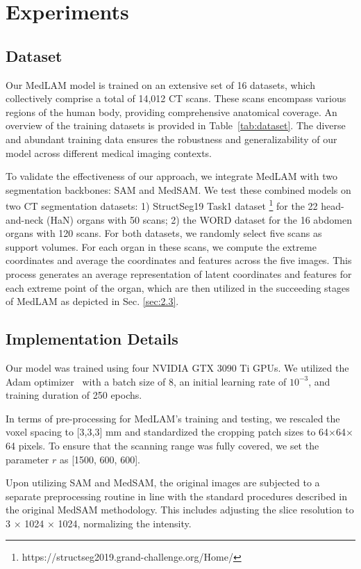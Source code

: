 \documentclass[a4paper]{llncs}
\begin{document}
\section{Experiments}

\subsection{Dataset}
\par Our MedLAM model is trained on an extensive set of 16 datasets, which collectively comprise a total of 14,012 CT scans. These scans encompass various regions of the human body, providing comprehensive anatomical coverage. An overview of the training datasets is provided in Table~\ref{tab:dataset}. The diverse and abundant training data ensures the robustness and generalizability of our model across different medical imaging contexts.
\par To validate the effectiveness of our approach, we integrate MedLAM with two segmentation backbones: SAM\cite{kirillov2023segment} and MedSAM\cite{MedSAM}. We test these combined models on two CT segmentation datasets: 1) StructSeg19 Task1 dataset \footnote{https://structseg2019.grand-challenge.org/Home/} for the 22 head-and-neck (HaN) organs with 50 scans; 2) the WORD dataset \cite{luo2022word} for the 16 abdomen organs with 120 scans. For both datasets, we randomly select five scans as support volumes. For each organ in these scans, we compute the extreme coordinates and average the coordinates and features across the five images. This process generates an average representation of latent coordinates and features for each extreme point of the organ, which are then utilized in the succeeding stages of MedLAM as depicted in Sec. \ref{sec:2.3}.



\subsection{Implementation Details}
Our model was trained using four NVIDIA GTX 3090 Ti GPUs. We utilized the Adam optimizer~\cite{kingma2014adam} with a batch size of 8, an initial learning rate of $10^{-3}$, and training duration of 250 epochs. 
\par In terms of pre-processing for MedLAM's training and testing, we rescaled the voxel spacing to [3,3,3] mm and standardized the cropping patch sizes to 64$\times$64$\times$64 pixels. To ensure that the scanning range was fully covered, we set the parameter $r$ as [1500, 600, 600]. 
\par Upon utilizing SAM and MedSAM, the original images are subjected to a separate preprocessing routine in line with the standard procedures described in the original MedSAM methodology. This includes adjusting the slice resolution to 3 × 1024 × 1024, normalizing the intensity.
\end{document}
